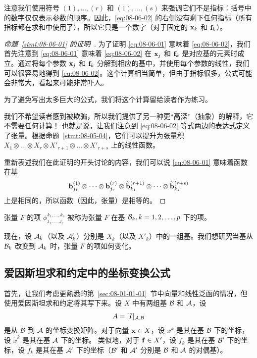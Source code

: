 注意我们使用符号 $(1), \dots, (r)$ 和 $(1), \dots, (s)$ 来强调它们不是指标：括号中的数字仅仅表示参数的顺序。因此，\eqref{eq:08-06-02} 的右侧没有剩下任何指标（所有指标都在求和中使用了），所以它只是一个数字（对于固定的 $\mathbf{x}_k$ 和 $\mathbf{f}_k$）。

\begin{proof}[\normalfont\heiti 命题~\ref{stmt:08-06-01} 的证明~\nopunct]
为了证明 \eqref{eq:08-06-01} 意味着 \eqref{eq:08-06-02}，我们首先注意到 \eqref{eq:08-06-01} 意味着 \eqref{eq:08-06-02} 在 $\mathbf{x}_j$ 和 $\mathbf{f}_k$ 是对应基的元素时成立。通过将每个参数 $\mathbf{x}_j$ 和 $\mathbf{f}_k$ 分解到相应的基中，并使用每个参数的线性，我们可以很容易地得到 \eqref{eq:08-06-02}。这个计算相当简单，但由于指标很多，公式可能会非常大，看起来可能非常吓人。


为了避免写出太多巨大的公式，我们将这个计算留给读者作为练习。

我们不希望读者感到被欺骗，所以我们提供了另一种更“高深”（抽象）的解释，它不需要任何计算！
也就是说，让我们注意到 \eqref{eq:08-06-02} 等式两边的表达式定义了张量。根据命题~\ref{stmt:08-05-04}，它们可以提升为张量积 $X_1 \otimes \dots \otimes X_r \otimes X'_{r+1} \otimes \dots \otimes X'_{r+s}$ 上的线性函数。

重新表述我们在此证明的开头讨论的内容，我们可以说 \eqref{eq:08-06-01} 意味着函数在基 $$\mathbf{b}^{(1)}_{j_1} \otimes \dots \otimes \mathbf{b}^{(r)}_{j_r} \otimes \widetilde{\mathbf{b}}^{(r+1)}_{k_1} \otimes \dots \otimes \widetilde{\mathbf{b}}^{(r+s)}_{k_s}$$
上是相同的，所以函数（因此，张量）是相等的。\end{proof}

张量 $F$ 的项 $\phi_{j_1, \dots, j_r}^{k_1, \dots, k_s}$ 被称为张量 $F$ 在基 $\mathcal{B}_k, k=1, 2, \dots, p$ 下的项。

现在，设 $\mathcal{A}_k$（以及 $\mathcal{A}'_k$）分别是 $X_k$（以及 $X'_k$）中的一组基。我们想研究当基从 $\mathcal{B}_k$ 改变到 $\mathcal{A}_k$ 时，张量 $F$ 的项如何变化。

\subsection{爱因斯坦求和约定中的坐标变换公式}\label{sec:08-06-02}

首先，让我们考虑更熟悉的第~\ref{sec:08-01-01-01}~节中向量和线性泛函的情况，但使用爱因斯坦求和约定将其写下来。设 $X$ 中有两组基 $\mathcal{B}$ 和 $\mathcal{A}$，设 $$A = [I]_{\mathcal{A},\mathcal{B}}$$
是从 $\mathcal{B}$ 到 $\mathcal{A}$ 的坐标变换矩阵。对于向量 $\mathbf{x} \in X$，设 $x^k$ 是其在基 $\mathcal{B}$ 下的坐标，设 $\widetilde{x}^k$ 是其在基 $\mathcal{A}$ 下的坐标。
类似地，对于 $\mathbf{f} \in X'$，设 $f_k$ 是其在基 $\mathcal{B}'$ 下的坐标，设 $\widetilde{f}_k$ 是其在基 $\mathcal{A}'$ 下的坐标（$\mathcal{B}'$ 和 $\mathcal{A}'$ 分别是 $\mathcal{B}$ 和 $\mathcal{A}$ 的对偶基）。

